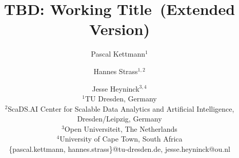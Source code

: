\title{TBD: Working Title\iflong~(Extended Version)\fi}

\author{
    Pascal Kettmann$^1$
    \and
    Hannes Strass$^{1,2}$
    \and
    Jesse Heyninck$^{3,4}$\\
    \affiliations
    $^1$TU Dresden, Germany\\
    $^2$ScaDS.AI Center for Scalable Data Analytics and Artificial Intelligence, Dresden/Leipzig, Germany\\
    $^3$Open Universiteit, The Netherlands\\
    $^4$University of Cape Town, South Africa\\
    \emails
    \{pascal.kettmann, hannes.strass\}@tu-dresden.de,
    jesse.heyninck@ou.nl
}
